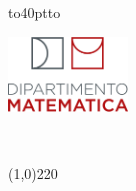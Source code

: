 \documentclass[12pt,a4paper,twoside,openany,english]{book}
\title{\myTitle}
\author{\myName}
\date{\today}
\begin{document}
\frontmatter
\begin{titlepage}
	\begin{center}
		\vbox to40pt{\vbox to}
	\end{center}
	\begin{minipage}{.20\textwidth}
		\includegraphics[height=2cm]{logo-department.png}
	\end{minipage}
	\hspace{40pt}
	\begin{minipage}{.80\textwidth}
		\begin{center}
			\begin{LARGE}
				\textsc{\textbf{\myUni}}\\
			\end{LARGE}
			\line(1,0){220}\\
			\begin{Large}
				\textsc{\myDepartment}\\
			\end{Large}
		\end{center}
	\end{minipage}
	\begin{center}
		\vfill
		\large{\textsc{\myDegree}}\\			

\end{center}
\end{titlepage}
\end{document}
